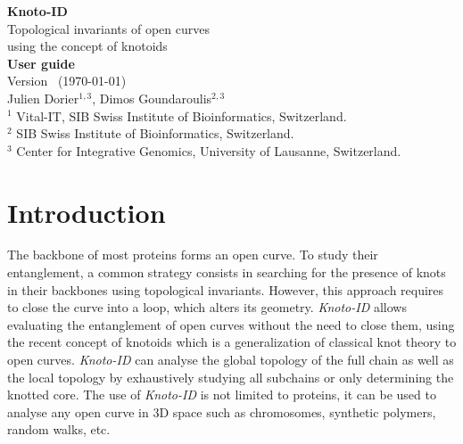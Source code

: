\documentclass[a4paper,10pt]{article}
\begin{document}
\begin{titlepage}
  \begin{center}
\vspace*{30mm}
 {\Huge \bf Knoto-ID}\\
\vspace*{5mm}
\LARGE{Topological invariants of open curves\\
  using the concept of knotoids}\\
\vspace*{20mm}
\LARGE{\bf User guide}\\
\vspace*{5mm}
\normalsize Version \cmakeversion \ (\today)\\
\vspace*{10mm}
Julien Dorier$^{1,3}$, Dimos Goundaroulis$^{2,3}$\\
\vspace*{5mm}
\small
$^1$ Vital-IT, SIB Swiss Institute of Bioinformatics, Switzerland.\\
$^2$ SIB Swiss Institute of Bioinformatics, Switzerland.\\
$^3$ Center for Integrative Genomics, University of Lausanne, Switzerland.\\
\end{center}
\end{titlepage}
\newpage

\tableofcontents
\newpage


\section{Introduction}
The backbone of most proteins forms an open curve.  To study their
entanglement, a common strategy consists in searching for the presence
of knots in their backbones using topological invariants.  However,
this approach requires to close the curve into a loop, which alters
its geometry.  {\it Knoto-ID} allows evaluating the
entanglement of open curves without the need to close them, using the
recent concept of knotoids\cite{turaev,guka} which is a generalization
of classical knot theory to open curves.  {\it Knoto-ID} can analyse
the global topology of the full chain as well as the local topology by
exhaustively studying all subchains or only determining the knotted
core.  The use of {\it Knoto-ID} is not limited to proteins, it can be
used to analyse any open curve in 3D space such as chromosomes,
synthetic polymers, random walks, etc.
\end{document}
